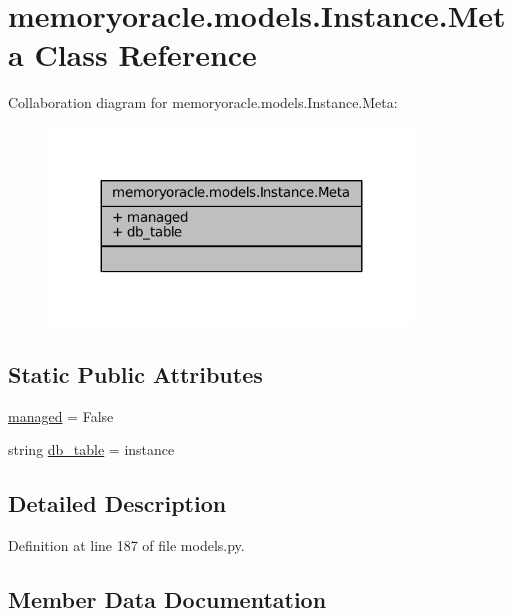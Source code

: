 \hypertarget{classmemoryoracle_1_1models_1_1Instance_1_1Meta}{}\section{memoryoracle.\+models.\+Instance.\+Meta Class Reference}
\label{classmemoryoracle_1_1models_1_1Instance_1_1Meta}


Collaboration diagram for memoryoracle.\+models.\+Instance.\+Meta\+:\nopagebreak
\begin{figure}[H]
\begin{center}
\leavevmode
\includegraphics[width=275pt]{classmemoryoracle_1_1models_1_1Instance_1_1Meta__coll__graph}
\end{center}
\end{figure}
\subsection*{Static Public Attributes}
\begin{DoxyCompactItemize}
\item 
\hyperlink{classmemoryoracle_1_1models_1_1Instance_1_1Meta_aa49b57f632dea2fadb768e9661b9bcaa}{managed} = False
\item 
string \hyperlink{classmemoryoracle_1_1models_1_1Instance_1_1Meta_a219ec0b854fe835781e6cfe1768c1660}{db\+\_\+table} = \textquotesingle{}instance\textquotesingle{}
\end{DoxyCompactItemize}


\subsection{Detailed Description}


Definition at line 187 of file models.\+py.



\subsection{Member Data Documentation}
\hypertarget{classmemoryoracle_1_1models_1_1Instance_1_1Meta_a219ec0b854fe835781e6cfe1768c1660}{}
